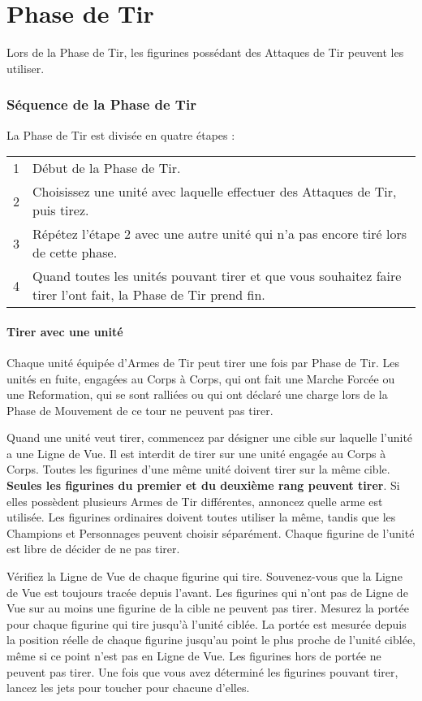 
\hypertarget{shootingphase}{\part{Phase de Tir}}

Lors de la Phase de Tir, les figurines possédant des Attaques de Tir peuvent les utiliser.

\section{Séquence de la Phase de Tir}

La Phase de Tir est divisée en quatre étapes :

\hspace*{0.3cm}
\begin{tabular}{c|m{14cm}}
1 & Début de la Phase de Tir. \tabularnewline
2 & Choisissez une unité avec laquelle effectuer des Attaques de Tir, puis tirez. \tabularnewline
3 & Répétez l'étape 2 avec une autre unité qui n'a pas encore tiré lors de cette phase. \tabularnewline
4 & Quand toutes les unités pouvant tirer et que vous souhaitez faire tirer l'ont fait, la Phase de Tir prend fin. \tabularnewline
\end{tabular}

\subsection{Tirer avec une unité}

Chaque unité équipée d'Armes de Tir peut tirer une fois par Phase de Tir. Les unités en fuite, engagées au Corps à Corps, qui ont fait une Marche Forcée ou une Reformation, qui se sont ralliées ou qui ont déclaré une charge lors de la Phase de Mouvement de ce tour ne peuvent pas tirer.

Quand une unité veut tirer, commencez par désigner une cible sur laquelle l'unité a une Ligne de Vue. Il est interdit de tirer sur une unité engagée au Corps à Corps. Toutes les figurines d'une même unité doivent tirer sur la même cible. \textbf{Seules les figurines du premier et du deuxième rang peuvent tirer}. Si elles possèdent plusieurs Armes de Tir différentes, annoncez quelle arme est utilisée. Les figurines ordinaires doivent toutes utiliser la même, tandis que les Champions et Personnages peuvent choisir séparément. Chaque figurine de l'unité est libre de décider de ne pas tirer.

Vérifiez la Ligne de Vue de chaque figurine qui tire. Souvenez-vous que la Ligne de Vue est toujours tracée depuis l'avant. Les figurines qui n'ont pas de Ligne de Vue sur au moins une figurine de la cible ne peuvent pas tirer. Mesurez la portée pour chaque figurine qui tire jusqu'à l'unité ciblée. La portée est mesurée depuis la position réelle de chaque figurine jusqu'au point le plus proche de l'unité ciblée, même si ce point n'est pas en Ligne de Vue. Les figurines hors de portée ne peuvent pas tirer. Une fois que vous avez déterminé les figurines pouvant tirer, lancez les jets pour toucher pour chacune d'elles.

